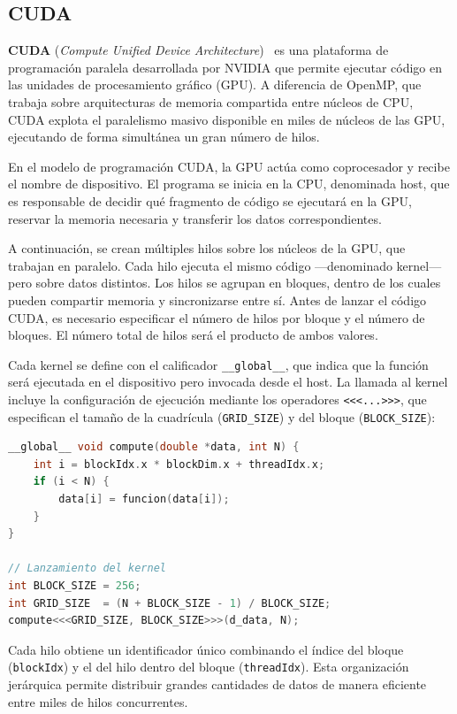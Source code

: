 \subsection{CUDA}\label{subsec:cuda}

\textbf{CUDA} (\textit{Compute Unified Device Architecture})~\cite{cuda-guide} es una plataforma de programación paralela desarrollada por NVIDIA que permite ejecutar código en las unidades de procesamiento gráfico (GPU).
A diferencia de OpenMP, que trabaja sobre arquitecturas de memoria compartida entre núcleos de CPU, CUDA explota el paralelismo masivo disponible en miles de núcleos de las GPU, ejecutando de forma simultánea un gran número de hilos.


En el modelo de programación CUDA, la GPU actúa como coprocesador y recibe el nombre de dispositivo.
El programa se inicia en la CPU, denominada host, que es responsable de decidir qué fragmento de código se ejecutará en la GPU, reservar la memoria necesaria y transferir los datos correspondientes.

A continuación, se crean múltiples hilos sobre los núcleos de la GPU, que trabajan en paralelo.
Cada hilo ejecuta el mismo código —denominado kernel— pero sobre datos distintos.
Los hilos se agrupan en bloques, dentro de los cuales pueden compartir memoria y sincronizarse entre sí.
Antes de lanzar el código CUDA, es necesario especificar el número de hilos por bloque y el número de bloques.
El número total de hilos será el producto de ambos valores.

Cada kernel se define con el calificador \texttt{\_\_global\_\_}, que indica que la función será ejecutada en el dispositivo pero invocada desde el host.
La llamada al kernel incluye la configuración de ejecución mediante los operadores \texttt{<<<...>>>}, que especifican el tamaño de la cuadrícula (\texttt{GRID\_SIZE}) y del bloque (\texttt{BLOCK\_SIZE}):
\begin{lstlisting}[language=C,label={lst:ejemplo_kernel}]
__global__ void compute(double *data, int N) {
    int i = blockIdx.x * blockDim.x + threadIdx.x;
    if (i < N) {
        data[i] = funcion(data[i]);
    }
}

// Lanzamiento del kernel
int BLOCK_SIZE = 256;
int GRID_SIZE  = (N + BLOCK_SIZE - 1) / BLOCK_SIZE;
compute<<<GRID_SIZE, BLOCK_SIZE>>>(d_data, N);
\end{lstlisting}

Cada hilo obtiene un identificador único combinando el índice del bloque (\texttt{blockIdx}) y el del hilo dentro del bloque (\texttt{threadIdx}).
Esta organización jerárquica permite distribuir grandes cantidades de datos de manera eficiente entre miles de hilos concurrentes.

